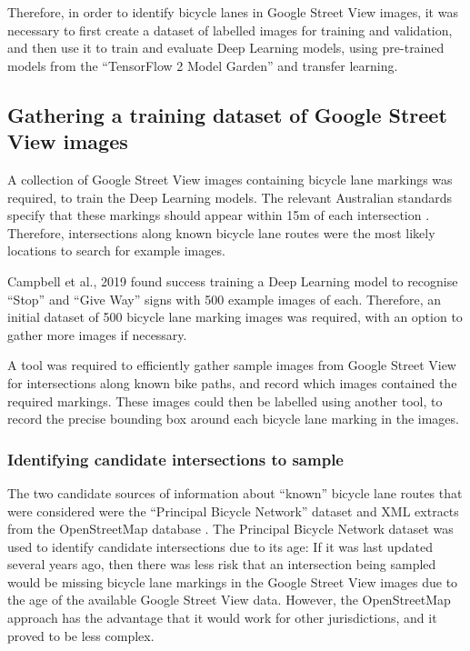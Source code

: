\documentclass[11pt,twoside]{report}
\begin{document}
Therefore, in order to identify bicycle lanes in Google Street View images, it was necessary to first create a dataset of labelled images for training and validation, and then use it to train and evaluate Deep Learning models, using pre-trained models from the ``TensorFlow 2 Model Garden'' and transfer learning.

\subsection{Gathering a training dataset of Google Street View images}

A collection of Google Street View images containing bicycle lane markings was required, to train the Deep Learning models.  The relevant Australian standards specify that these markings should appear within 15m of each intersection \cite{standards}.  Therefore, intersections along known bicycle lane routes were the most likely locations to search for example images.

Campbell et al., 2019 \cite{CAMPBELL2019101350} found success training a Deep Learning model to recognise ``Stop'' and ``Give Way'' signs with 500 example images of each.  Therefore, an initial dataset of 500 bicycle lane marking images was required, with an option to gather more images if necessary.

A tool was required to efficiently gather sample images from Google Street View for intersections along known bike paths, and record which images contained the required markings.  These images could then be labelled using another tool, to record the precise bounding box around each bicycle lane marking in the images.

\subsubsection{Identifying candidate intersections to sample}

The two candidate sources of information about ``known'' bicycle lane routes that were considered were the ``Principal Bicycle Network'' dataset \cite{PrincipalBicycleNetwork} and XML extracts from the OpenStreetMap database \cite{OPENSTREETMAP}.  The Principal Bicycle Network dataset was used to identify candidate intersections due to its age:  If it was last updated several years ago, then there was less risk that an intersection being sampled would be missing bicycle lane markings in the Google Street View images due to the age of the available Google Street View data.  However, the OpenStreetMap approach has the advantage that it would work for other jurisdictions, and it proved to be less complex.
\end{document}
